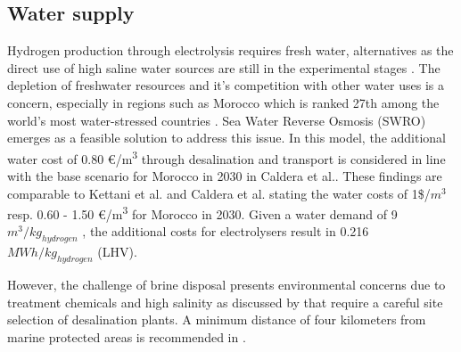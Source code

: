 \subsection*{Water supply}
\label{subsec:water_supply}
Hydrogen production through electrolysis requires fresh water, alternatives as the direct use of high saline water sources are still in the experimental stages \cite{Tong2020}. The depletion of freshwater resources and it's competition with other water uses is a concern, especially in regions such as Morocco which is ranked 27th among the world's most water-stressed countries \cite{Maddocks2015}. 
Sea Water Reverse Osmosis (SWRO) emerges as a feasible solution to address this issue. In this model, the additional water cost of 0.80 €/\si{\cubic\metre} through desalination and transport is considered in line with the base scenario for Morocco in 2030 in Caldera et al.\cite{Caldera2020}. These findings are comparable to Kettani et al.\cite{Kettani2020} and Caldera et al.\cite{Caldera2016} stating the water costs of 1\$/$m^3$ resp. 0.60 - 1.50 €/\si{\cubic\metre} for Morocco in 2030. Given a water demand of 9~$m^3/kg_{hydrogen}$
\cite{Hampp2023}, the additional costs for electrolysers result in 0.216~$MWh/kg_{hydrogen}$ (LHV).

However, the challenge of brine disposal presents environmental concerns due to treatment chemicals and high salinity as discussed by \cite{Thomann2022, Dresp2019, Tonelli2023} that require a careful site selection of desalination plants. A minimum distance of four kilometers from marine protected areas is recommended in \cite{Thomann2022}.


